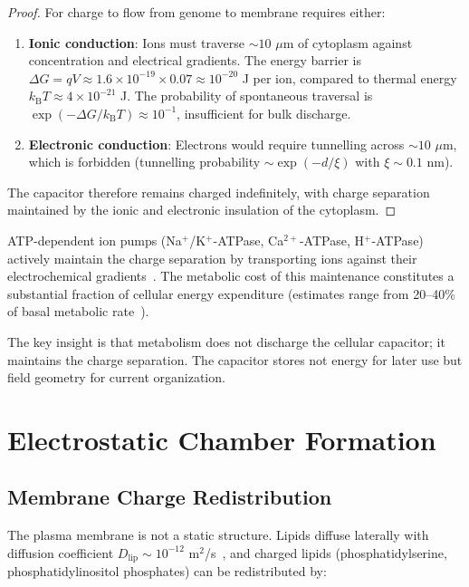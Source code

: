 \documentclass[twocolumn,10pt,aps,prd,superscriptaddress,floatfix,nofootinbib]{revtex4-2}
\theoremstyle{remark}
\newcommand{\kB}{k_{\mathrm{B}}}
\begin{document}
\begin{proof}
For charge to flow from genome to membrane requires either:
\begin{enumerate}
\item \textbf{Ionic conduction}: Ions must traverse $\sim 10$ $\mu$m of cytoplasm against concentration and electrical gradients. The energy barrier is $\Delta G = qV \approx 1.6 \times 10^{-19} \times 0.07 \approx 10^{-20}$ J per ion, compared to thermal energy $\kB T \approx 4 \times 10^{-21}$ J. The probability of spontaneous traversal is $\exp(-\Delta G/\kB T) \approx 10^{-1}$, insufficient for bulk discharge.

\item \textbf{Electronic conduction}: Electrons would require tunnelling across $\sim 10$ $\mu$m, which is forbidden (tunnelling probability $\sim \exp(-d/\xi)$ with $\xi \sim 0.1$ nm).
\end{enumerate}

The capacitor therefore remains charged indefinitely, with charge separation maintained by the ionic and electronic insulation of the cytoplasm.
\end{proof}

ATP-dependent ion pumps (Na$^+$/K$^+$-ATPase, Ca$^{2+}$-ATPase, H$^+$-ATPase) actively maintain the charge separation by transporting ions against their electrochemical gradients~\cite{Alberts2015}. The metabolic cost of this maintenance constitutes a substantial fraction of cellular energy expenditure (estimates range from 20--40\% of basal metabolic rate~\cite{Rolfe1997}).

The key insight is that metabolism does not discharge the cellular capacitor; it maintains the charge separation. The capacitor stores not energy for later use but field geometry for current organization.

\section{Electrostatic Chamber Formation}
\label{sec:chambers}

\subsection{Membrane Charge Redistribution}

The plasma membrane is not a static structure. Lipids diffuse laterally with diffusion coefficient $D_{\mathrm{lip}} \sim 10^{-12}$ m$^2$/s~\cite{Saffman1975}, and charged lipids (phosphatidylserine, phosphatidylinositol phosphates) can be redistributed by:
\end{document}
